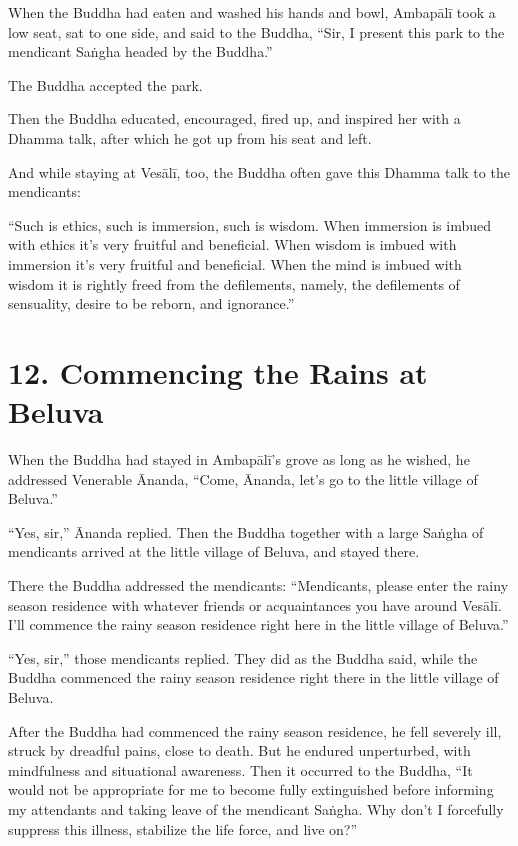 \documentclass[12pt,openany]{book}%
\begin{document}
When the Buddha had eaten and washed his hands and bowl, \textsanskrit{Ambapālī} took a low seat, sat to one side, and said to the Buddha, “Sir, I present this park to the mendicant \textsanskrit{Saṅgha} headed by the Buddha.” 

The Buddha accepted the park. 

Then the Buddha educated, encouraged, fired up, and inspired her with a Dhamma talk, after which he got up from his seat and left. 

And while staying at \textsanskrit{Vesālī}, too, the Buddha often gave this Dhamma talk to the mendicants: 

“Such is ethics, such is immersion, such is wisdom. When immersion is imbued with ethics it’s very fruitful and beneficial. When wisdom is imbued with immersion it’s very fruitful and beneficial. When the mind is imbued with wisdom it is rightly freed from the defilements, namely, the defilements of sensuality, desire to be reborn, and ignorance.” 

\section*{12. Commencing the Rains at Beluva }

When the Buddha had stayed in \textsanskrit{Ambapālī}’s grove as long as he wished, he addressed Venerable Ānanda, “Come, Ānanda, let’s go to the little village of Beluva.” 

“Yes, sir,” Ānanda replied. Then the Buddha together with a large \textsanskrit{Saṅgha} of mendicants arrived at the little village of Beluva, and stayed there. 

There the Buddha addressed the mendicants: “Mendicants, please enter the rainy season residence with whatever friends or acquaintances you have around \textsanskrit{Vesālī}. I’ll commence the rainy season residence right here in the little village of Beluva.” 

“Yes, sir,” those mendicants replied. They did as the Buddha said, while the Buddha commenced the rainy season residence right there in the little village of Beluva. 

After the Buddha had commenced the rainy season residence, he fell severely ill, struck by dreadful pains, close to death. But he endured unperturbed, with mindfulness and situational awareness. Then it occurred to the Buddha, “It would not be appropriate for me to become fully extinguished before informing my attendants and taking leave of the mendicant \textsanskrit{Saṅgha}. Why don’t I forcefully suppress this illness, stabilize the life force, and live on?” 
\end{document}
